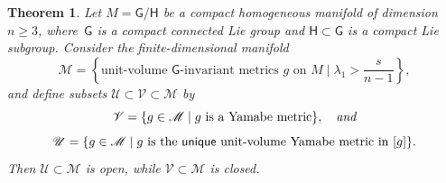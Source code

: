 \documentclass[pdftex]{sigma}
\numberwithin{equation}{section}
\newtheorem{Theorem}{Theorem}[section]
\begin{document}
\begin{Theorem} Let $M= \mathsf{G}/\mathsf{H}$ be a compact homogeneous manifold of dimension $n \geq 3$, where~$\mathsf{G}$ is a compact connected
Lie group and
$\mathsf{H}\subset \mathsf{G}$ is a compact Lie subgroup. Consider the finite-dimensional manifold
\begin{equation*}
\mathscr{M} = \left\{ \text{unit-volume $\mathsf{G}$-invariant metrics } g \text{ on } M \mid \lambda_1 > \frac{s}{n-1} \right\},
\end{equation*}
and define subsets $\mathscr{U}\subset \mathscr{V}\subset \mathscr{M}$ by
\begin{equation*}
\mathscr{V} = \{ g \in \mathscr{M} \mid g \text{ is a Yamabe metric} \},\quad \text{\em and}
\end{equation*}
\begin{equation*}
\mathscr{U} = \{ g \in \mathscr{M} \mid g \text{ is the {\sf unique} unit-volume Yamabe metric in } [g]\}.
\end{equation*}
Then $\mathscr{U}\subset\mathscr{M}$ is open, while $\mathscr{V}\subset \mathscr{M}$ is closed.
\end{Theorem}
\end{document}
